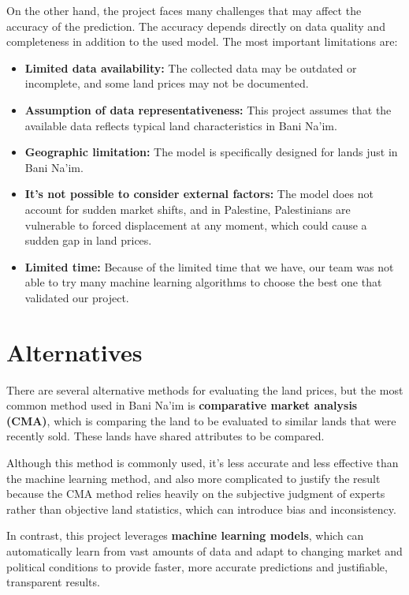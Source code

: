 \documentclass[12pt,oneside]{report}
\begin{document}
On the other hand, the project faces many challenges that may affect the accuracy of the prediction. The accuracy depends directly on data quality and completeness in addition to the used model. The most important limitations are:

\begin{itemize}[leftmargin=*]
    \item \textbf{Limited data availability:} The collected data may be outdated or incomplete, and some land prices may not be documented.
    \item \textbf{Assumption of data representativeness:} This project assumes that the available data reflects typical land characteristics in Bani Na’im.
    \item \textbf{Geographic limitation:} The model is specifically designed for lands just in Bani Na’im.
    \item \textbf{It's not possible to consider external factors:} The model does not account for sudden market shifts, and in Palestine, Palestinians are vulnerable to forced displacement at any moment, which could cause a sudden gap in land prices.
    \item \textbf{Limited time:} Because of the limited time that we have, our team was not able to try many machine learning algorithms to choose the best one that validated our project.
\end{itemize}


\section{Alternatives}
There are several alternative methods for evaluating the land prices, but the most common method used in Bani Na’im is \textbf{comparative market analysis (CMA)}, which is comparing the land to be evaluated to similar lands that were recently sold. These lands have shared attributes to be compared.

Although this method is commonly used, it’s less accurate and less effective than the machine learning method, and also more complicated to justify the result because the CMA method relies heavily on the subjective judgment of experts rather than objective land statistics, which can introduce bias and inconsistency.

In contrast, this project leverages \textbf{machine learning models}, which can automatically learn from vast amounts of data and adapt to changing market and political conditions to provide faster, more accurate predictions and justifiable, transparent results.
\end{document}
